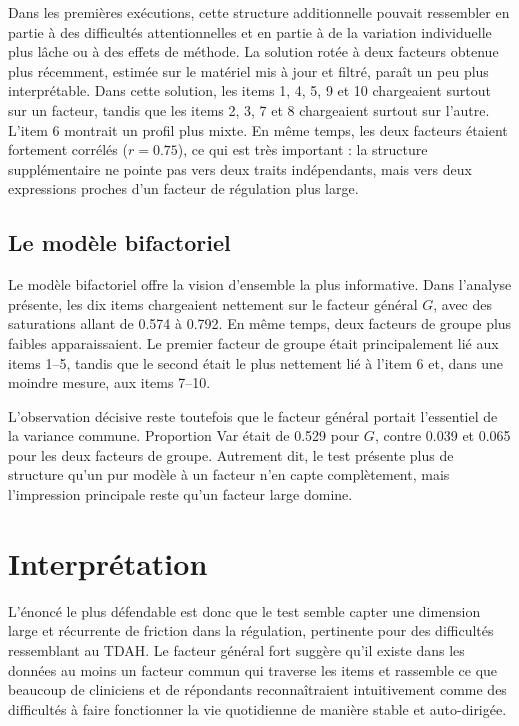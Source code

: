 \documentclass[11pt,a4paper]{article}
\begin{document}
Dans les premières exécutions, cette structure additionnelle pouvait ressembler en partie à des difficultés attentionnelles et en partie à de la variation individuelle plus lâche ou à des effets de méthode. La solution rotée à deux facteurs obtenue plus récemment, estimée sur le matériel mis à jour et filtré, paraît un peu plus interprétable. Dans cette solution, les items 1, 4, 5, 9 et 10 chargeaient surtout sur un facteur, tandis que les items 2, 3, 7 et 8 chargeaient surtout sur l’autre. L’item 6 montrait un profil plus mixte. En même temps, les deux facteurs étaient fortement corrélés ($r = 0.75$), ce qui est très important : la structure supplémentaire ne pointe pas vers deux traits indépendants, mais vers deux expressions proches d’un facteur de régulation plus large.

\subsection{Le modèle bifactoriel}
Le modèle bifactoriel offre la vision d’ensemble la plus informative. Dans l’analyse présente, les dix items chargeaient nettement sur le facteur général $G$, avec des saturations allant de 0.574 à 0.792. En même temps, deux facteurs de groupe plus faibles apparaissaient. Le premier facteur de groupe était principalement lié aux items 1--5, tandis que le second était le plus nettement lié à l’item 6 et, dans une moindre mesure, aux items 7--10.

L’observation décisive reste toutefois que le facteur général portait l’essentiel de la variance commune. Proportion Var était de 0.529 pour $G$, contre 0.039 et 0.065 pour les deux facteurs de groupe. Autrement dit, le test présente plus de structure qu’un pur modèle à un facteur n’en capte complètement, mais l’impression principale reste qu’un facteur large domine.

\section{Interprétation}
L’énoncé le plus défendable est donc que le test semble capter une dimension large et récurrente de friction dans la régulation, pertinente pour des difficultés ressemblant au TDAH. Le facteur général fort suggère qu’il existe dans les données au moins un facteur commun qui traverse les items et rassemble ce que beaucoup de cliniciens et de répondants reconnaîtraient intuitivement comme des difficultés à faire fonctionner la vie quotidienne de manière stable et auto-dirigée.
\end{document}
